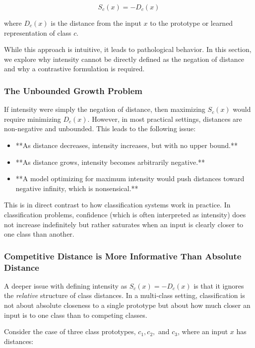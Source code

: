 \documentclass[12pt]{article}
\begin{document}
\[
S_c(x) = -D_c(x)
\]

where \( D_c(x) \) is the distance from the input \( x \) to the prototype or learned representation of class \( c \). 

While this approach is intuitive, it leads to pathological behavior. In this section, we explore why intensity cannot be directly defined as the negation of distance and why a contrastive formulation is required.

\subsubsection{The Unbounded Growth Problem}

If intensity were simply the negation of distance, then maximizing \( S_c(x) \) would require minimizing \( D_c(x) \). However, in most practical settings, distances are non-negative and unbounded. This leads to the following issue:

\begin{itemize}
    \item **As distance decreases, intensity increases, but with no upper bound.**
    \item **As distance grows, intensity becomes arbitrarily negative.**
    \item **A model optimizing for maximum intensity would push distances toward negative infinity, which is nonsensical.**
\end{itemize}

This is in direct contrast to how classification systems work in practice. In classification problems, confidence (which is often interpreted as intensity) does not increase indefinitely but rather saturates when an input is clearly closer to one class than another.

\subsubsection{Competitive Distance is More Informative Than Absolute Distance}

A deeper issue with defining intensity as \( S_c(x) = -D_c(x) \) is that it ignores the \textit{relative} structure of class distances. In a multi-class setting, classification is not about absolute closeness to a single prototype but about how much closer an input is to one class than to competing classes.

Consider the case of three class prototypes, \( c_1, c_2, \) and \( c_3 \), where an input \( x \) has distances:
\end{document}
